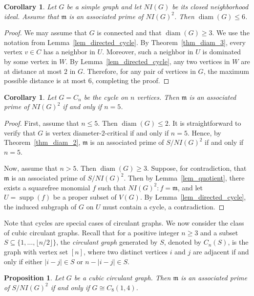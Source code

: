 \documentclass[12pt,reqno,twoside]{amsart}
\newcommand{\mm}{\mathfrak m}
\DeclareMathOperator{\diam}{diam}
\DeclareMathOperator{\supp}{supp}
\newtheorem{cor}[thm]{\bf Corollary}
\newtheorem{prop}[thm]{\bf Proposition}
\theoremstyle{definition}
\theoremstyle{plain}
\theoremstyle{remark}
\numberwithin{equation}{section}
\begin{document}
\begin{cor}\label{cor_diam_bound}
Let $G$ be a simple graph and let $NI(G)$ be its closed neighborhood ideal. Assume that $\mm$ is an associated prime of $NI(G)^2$. Then $\diam(G) \leq 6$.    
\end{cor}

\begin{proof}
We may assume that $G$ is connected and that $\diam(G) \geq 3$. We use the notation from Lemma~\ref{lem_directed_cycle}. By Theorem~\ref{thm_diam_3}, every vertex $v \in C$ has a neighbor in $U$. Moreover, such a neighbor in $U$ is dominated by some vertex in $W$. By Lemma~\ref{lem_directed_cycle}, any two vertices in $W$ are at distance at most $2$ in $G$. Therefore, for any pair of vertices in $G$, the maximum possible distance is at most $6$, completing the proof.
\end{proof}


\begin{cor}
Let $G = C_n$ be the cycle on $n$ vertices. Then $\mm$ is an associated prime of $NI(G)^2$ if and only if $n = 5$.     
\end{cor}

\begin{proof}
First, assume that $n \leq 5$. Then $\diam(G) \le 2$. It is straightforward to verify that $G$ is vertex diameter-$2$-critical if and only if $n = 5$. Hence, by Theorem~\ref{thm_diam_2}, $\mm$ is an associated prime of $S/NI(G)^2$ if and only if $n = 5$.

Now, assume that $n > 5$. Then $\diam(G) \geq 3$. Suppose, for contradiction, that $\mm$ is an associated prime of $S/NI(G)^2$. Then by Lemma~\ref{lem_quotient}, there exists a squarefree monomial $f$ such that $NI(G)^2 : f = \mm$, and let $U = \supp(f)$ be a proper subset of $V(G)$. By Lemma~\ref{lem_directed_cycle}, the induced subgraph of $G$ on $U$ must contain a cycle, a contradiction.
\end{proof}

Note that cycles are special cases of circulant graphs. We now consider the class of cubic circulant graphs. Recall that for a positive integer $n \geq 3$ and a subset $S \subseteq \{1, \ldots, \lfloor n/2 \rfloor\}$, the \emph{circulant graph} generated by $S$, denoted by $C_n(S)$, is the graph with vertex set $[n]$, where two distinct vertices $i$ and $j$ are adjacent if and only if either $|i - j| \in S$ or $n - |i - j| \in S$.

\begin{prop}
Let $G$ be a cubic circulant graph. Then $\mm$ is an associated prime of $S/NI(G)^2$ if and only if $G \cong C_8(1,4)$.
\end{prop}
\end{document}

